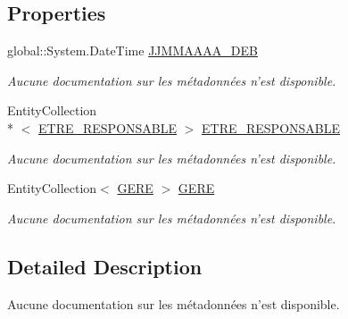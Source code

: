 \subsection*{Properties}
\begin{DoxyCompactItemize}
\item 
global\-::\-System.\-Date\-Time \hyperlink{class_model_1_1_c_a_l_e_n_d_r_i_e_r_ac108f24337afda1c3aae9ad11e06706f}{J\-J\-M\-M\-A\-A\-A\-A\-\_\-\-D\-E\-B}
\begin{DoxyCompactList}\small\item\em Aucune documentation sur les métadonnées n'est disponible. \end{DoxyCompactList}\item 
Entity\-Collection\\*
$<$ \hyperlink{class_model_1_1_e_t_r_e___r_e_s_p_o_n_s_a_b_l_e}{E\-T\-R\-E\-\_\-\-R\-E\-S\-P\-O\-N\-S\-A\-B\-L\-E} $>$ \hyperlink{class_model_1_1_c_a_l_e_n_d_r_i_e_r_a59c5b444cf3d54009756f7c4772d3a99}{E\-T\-R\-E\-\_\-\-R\-E\-S\-P\-O\-N\-S\-A\-B\-L\-E}
\begin{DoxyCompactList}\small\item\em Aucune documentation sur les métadonnées n'est disponible. \end{DoxyCompactList}\item 
Entity\-Collection$<$ \hyperlink{class_model_1_1_g_e_r_e}{G\-E\-R\-E} $>$ \hyperlink{class_model_1_1_c_a_l_e_n_d_r_i_e_r_a0da6b33d11ac2daa1651c78a755662f1}{G\-E\-R\-E}
\begin{DoxyCompactList}\small\item\em Aucune documentation sur les métadonnées n'est disponible. \end{DoxyCompactList}\end{DoxyCompactItemize}


\subsection{Detailed Description}
Aucune documentation sur les métadonnées n'est disponible. 



